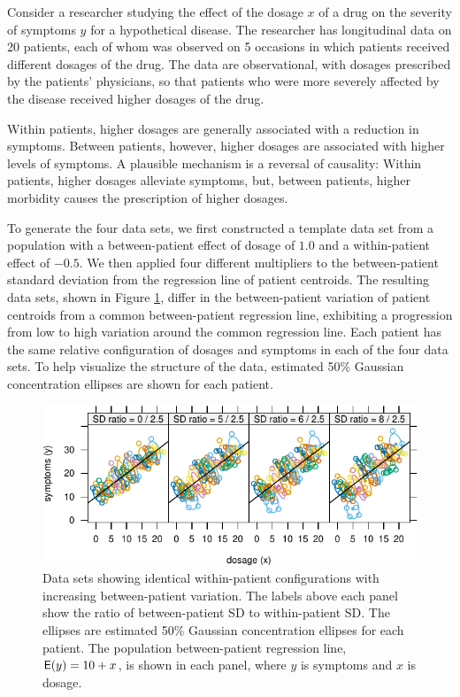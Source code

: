 \documentclass[
]{jss}
\begin{document}
Consider a researcher studying the effect of the dosage \(x\) of a drug
on the severity of symptoms \(y\) for a hypothetical disease. The
researcher has longitudinal data on 20 patients, each of whom was
observed on 5 occasions in which patients received different dosages of
the drug. The data are observational, with dosages prescribed by the
patients' physicians, so that patients who were more severely affected
by the disease received higher dosages of the drug.

Within patients, higher dosages are generally associated with a
reduction in symptoms. Between patients, however, higher dosages are
associated with higher levels of symptoms. A plausible mechanism is a
reversal of causality: Within patients, higher dosages alleviate
symptoms, but, between patients, higher morbidity causes the
prescription of higher dosages.

To generate the four data sets, we first constructed a template data set
from a population with a between-patient effect of dosage of \(1.0\) and
a within-patient effect of \(-0.5\). We then applied four different
multipliers to the between-patient standard deviation from the
regression line of patient centroids. The resulting data sets, shown in
Figure \ref{fig:plot1}, differ in the between-patient variation of
patient centroids from a common between-patient regression line,
exhibiting a progression from low to high variation around the common
regression line. Each patient has the same relative configuration of
dosages and symptoms in each of the four data sets. To help visualize
the structure of the data, estimated 50\% Gaussian concentration
ellipses are shown for each patient.

\begin{CodeChunk}
\begin{figure}

{\centering \includegraphics[width=0.75\linewidth]{Figures/plot1-1}

}

\caption[Data sets showing identical within-patient configurations with increasing between-patient variation]{Data sets showing identical within-patient configurations with increasing between-patient variation. The labels above each panel show the ratio of between-patient SD to within-patient SD. The ellipses are estimated 50\% Gaussian concentration ellipses for each patient. The population between-patient regression line, $\mathsf{E}(y) = 10 + x$, is shown in each panel, where $y$ is symptoms and $x$ is dosage.}\label{fig:plot1}
\end{figure}
\end{CodeChunk}
\end{document}
